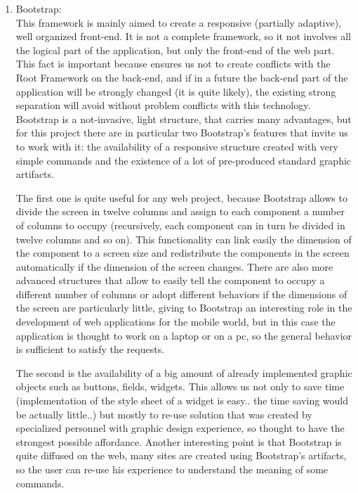\begin{enumerate}
\item
Bootstrap:
\\
\noindent
This framework is mainly aimed to create a responsive (partially adaptive), well organized front-end. It is not a complete framework, so it not involves all the logical part of the application, but only the front-end of the web part. This fact is important because ensures us not to create conflicts with the Root Framework on the back-end, and if in a future the back-end part of the application will be strongly changed (it is quite likely), the existing strong separation will avoid without problem conflicts with this technology. Bootstrap is a not-invasive, light structure, that carries many advantages, but for this project there are in particular two Bootstrap's features that invite us to work with it: the availability of a responsive structure created with very simple commands and the existence of a lot of pre-produced standard graphic artifacts. 

The first one is quite useful for any web project, because Bootstrap allows to divide the screen in twelve columns and assign to each component a number of columns to occupy (recursively, each component can in turn be divided in twelve columns and so on). This functionality can link easily the dimension of the component to a screen size and redistribute the components in the screen automatically if the dimension of the screen changes. There are also more advanced structures that allow to easily tell the component to occupy a different number of columns or adopt different behaviors if the dimensions of the screen are particularly little, giving to Bootstrap an interesting role in the development of web applications for the mobile world, but in this case the application is thought to work on a laptop or on a pc, so the general behavior is sufficient to satisfy the requests.



The second is the availability of a big amount of already implemented graphic objects such as buttons, fields, widgets. This allows us not only to save time (implementation of the style sheet of a widget is easy.. the time saving would be actually little..) but mostly to re-use solution that was created by specialized personnel with graphic design experience, so thought to have the strongest possible affordance. Another interesting point is that Bootstrap is quite diffused on the web, many sites are created using Bootstrap's artifacts, so the user can re-use his experience to understand the meaning of some commands. 
  

\end{enumerate}
